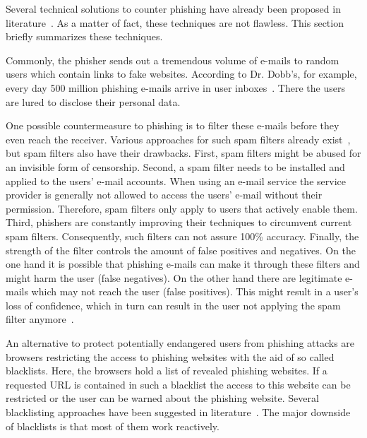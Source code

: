 Several technical solutions to counter phishing have already been proposed in literature~\cite{purkait2012phishing}. 
As a matter of fact, these techniques are not flawless. 
This section briefly summarizes these techniques.

Commonly, the phisher sends out a tremendous volume of e-mails to random users which contain links to fake websites.
According to Dr. Dobb's, for example, every day 500 million phishing e-mails arrive in user inboxes~\cite{drdobb2012email}.
 There the users are lured to disclose their personal data.

\begin{description}[leftmargin=0cm]
	\item[Spam filters.] One possible countermeasure to phishing is to filter these e-mails before they even reach the receiver.
 Various approaches for such spam filters already exist~\cite{bergholz2010new,chandrasekaran2006phishing,fette2007learning}, but spam filters also have their drawbacks.
 First, spam filters might be abused for an invisible form of censorship.
 Second, a spam filter needs to be installed and applied to the users' e-mail accounts.
 When using an e-mail service the service provider is generally not allowed to access the users' e-mail without their permission.
 Therefore, spam filters only apply to users that actively enable them.
 Third, phishers are constantly improving their techniques to circumvent current spam filters.
 Consequently, such filters can not assure 100\% accuracy.
 Finally, the strength of the filter controls the amount of false positives and negatives.
 On the one hand it is possible that phishing e-mails can make it through these filters and might harm the user (false negatives). 
On the other hand there are legitimate e-mails which may not reach the user (false positives). 
This might result in a user's loss of confidence, which in turn can result in the user not applying the spam filter anymore~\cite{olivo2011obtaining}.
	\item[Blacklists.] An alternative to protect potentially endangered users from phishing attacks are browsers restricting the access to phishing websites with the aid of so called blacklists.
 Here, the browsers hold a list of revealed phishing websites.
 If a requested URL is contained in such a blacklist the access to this website can be restricted or the user can be warned about the phishing website.
 Several blacklisting approaches have been suggested in literature~\cite{ma2009beyond, zhang2008highly}. The major downside of blacklists is that most of them work reactively.

\end{description}
